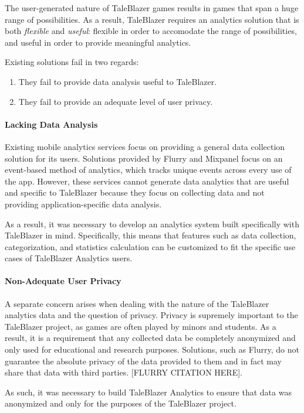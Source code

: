 The user-generated nature of TaleBlazer games results in games that span a huge range of possibilities. As a result, TaleBlazer requires an analytics solution that is both \textit{flexible} and \textit{useful}: flexible in order to accomodate the range of possibilities, and useful in order to provide meaningful analytics.

Existing solutions fail in two regards:
	\begin{enumerate}
		\item They fail to provide data analysis useful to TaleBlazer.
		\item They fail to provide an adequate level of user privacy.
	\end{enumerate}

\paragraph{Lacking Data Analysis}

Existing mobile analytics services focus on providing a general data collection solution for its users. Solutions provided by Flurry and Mixpanel focus on an event-based method of analytics, which tracks unique events across every use of the app. However, these services cannot generate data analytics that are useful and specific to TaleBlazer because they focus on collecting data and not providing application-specific data analysis.

As a result, it was necessary to develop an analytics system built specifically with TaleBlazer in mind. Specifically, this means that features such as data collection, categorization, and statistics calculation can be customized to fit the specific use cases of TaleBlazer Analytics users. 

\paragraph{Non-Adequate User Privacy}

A separate concern arises when dealing with the nature of the TaleBlazer analytics data and the question of privacy. Privacy is supremely important to the TaleBlazer project, as games are often played by minors and students. As a result, it is a requirement that any collected data be completely anonymized and only used for educational and research purposes. Solutions, such as Flurry, do not guarantee the absolute privacy of the data provided to them and in fact may share that data with third parties. [FLURRY CITATION HERE].

As such, it was necessary to build TaleBlazer Analytics to ensure that data was anonymized and only for the purposes of the TaleBlazer project. 





















